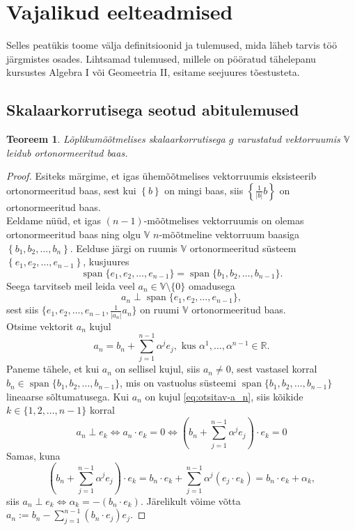 \documentclass[a4paper,12pt]{article}
\theoremstyle{plain}
\newtheorem{teoreem}{Teoreem}[section]
\theoremstyle{definition}
\numberwithin{equation}{section}
\DeclareMathOperator{\spn}{span}
\begin{document}
\newpage
\section{Vajalikud eelteadmised}

Selles peatükis toome välja definitsioonid ja tulemused, mida läheb tarvis töö järgmistes osades. Lihtsamad tulemused, millele on pööratud tähelepanu kursustes Algebra I või Geomeetria II, esitame seejuures tõestusteta.

\subsection{Skalaarkorrutisega seotud abitulemused}
\label{eelteadmised:skalaar}

\begin{teoreem} \textnormal{\cite[teoreem II.7.3]{FA2}}
Lõplikumõõtmelises skalaarkorrutisega $g$ varustatud vektorruumis $\mathbb{V}$ leidub ortonormeeritud baas.
\end{teoreem}
\begin{proof}
Esiteks märgime, et igas ühemõõtmelises vektorruumis eksisteerib ortonormeeritud baas, sest kui $\left\lbrace b \right\rbrace$ on mingi baas, siis $\left\lbrace \frac{1}{|b|} b\right\rbrace$ on ortonormeeritud baas.\\
Eeldame nüüd, et igas $(n-1)$-mõõtmelises vektorruumis on olemas ortonormeeritud baas ning olgu $\mathbb{V}$ $n$-mõõtmeline vektorruum baasiga $\left\lbrace b_1, b_2, \dots, b_n \right\rbrace$. Eelduse järgi on ruumis $\mathbb{V}$ ortonormeeritud süsteem $\left\lbrace e_1, e_2, \dots, e_{n-1} \right\rbrace$, kusjuures
\[ \spn\{ e_1, e_2, \dots, e_{n-1}\} = \spn\{ b_1, b_2, \dots, b_{n-1}\}. \]
Seega tarvitseb meil leida veel $a_n \in \mathbb{V} \setminus \{0\}$ omadusega
\[a_n \perp \spn\{ e_1, e_2, \dots, e_{n-1}\},\]
sest siis $\{ e_1, e_2, \dots, e_{n-1}, \frac{1}{|a_n|}a_n\}$ on ruumi $\mathbb{V}$ ortonormeeritud baas.\\
Otsime vektorit $a_n$ kujul
\begin{equation} \label{eq:otsitav-a_n}
a_n = b_n + \sum_{j = 1}^{n-1} \alpha^j e_j, \text{ kus } \alpha^1, \dots, \alpha^{n-1} \in \mathbb{R}.
\end{equation}
Paneme tähele, et kui $a_n$ on sellisel kujul, siis $a_n \neq 0$, sest vastasel korral $b_n \in \spn\{ b_1, b_2, \dots, b_{n-1}\}$, mis on vastuolus süsteemi $\spn\{ b_1, b_2, \dots, b_{n-1}\}$ lineaarse sõltumatusega.
Kui $a_n$ on kujul \ref{eq:otsitav-a_n}, siis kõikide $k \in \{1, 2, \dots, n-1\}$ korral
\begin{equation*}
a_n \perp e_k \iff a_n \cdot e_k = 0 \iff \left(b_n + \sum_{j = 1}^{n-1} \alpha^j e_j\right) \cdot e_k = 0
\end{equation*}
Samas, kuna
\begin{equation*}
\left(b_n + \sum_{j = 1}^{n-1} \alpha^j e_j\right) \cdot e_k = b_n \cdot e_k + \sum_{j = 1}^{n-1} \alpha^j \left(e_j \cdot e_k \right) = b_n \cdot e_k + \alpha_k,
\end{equation*}
siis $a_n \perp e_k \iff \alpha_k = - \left(b_n \cdot e_k \right)$. \newline
Järelikult võime võtta $a_n := b_n - \sum_{j=1}^{n-1}\left(b_n \cdot e_j\right)e_j$.
\end{proof}
\end{document}
